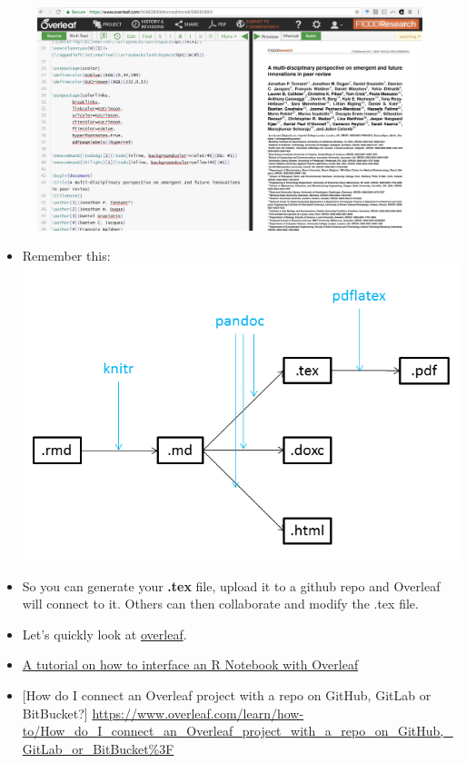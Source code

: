 \documentclass[]{article}
\begin{document}
\begin{figure}
\centering
\includegraphics[width=5.20833in]{../figures/overleaf.png}
\caption{}
\end{figure}

\begin{itemize}
\item
  Remember this:\\
  \includegraphics[width=5.20833in]{../figures/pandoc1.png}
\item
  So you can generate your \textbf{.tex} file, upload it to a github
  repo and Overleaf will connect to it. Others can then collaborate and
  modify the .tex file.
\item
  Let's quickly look at \href{https://www.overleaf.com/}{overleaf}.
\item
  \href{https://medium.com/@arinbasu/a-tutorial-on-how-to-interface-an-r-notebook-with-overleaf-11f23c306cfd}{A
  tutorial on how to interface an R Notebook with Overleaf}
\item
  {[}How do I connect an Overleaf project with a repo on GitHub, GitLab
  or BitBucket?{]}
  \url{https://www.overleaf.com/learn/how-to/How_do_I_connect_an_Overleaf_project_with_a_repo_on_GitHub,_GitLab_or_BitBucket\%3F}
\end{itemize}
\end{document}
